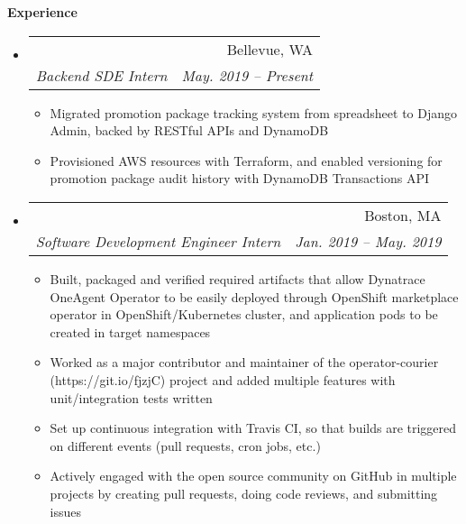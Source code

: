 \documentclass{article}
\makeatletter
\newcommand{\resitem}[1]{
    \item #1
    \vspace{-2pt}
}
\newcommand{\resheading}[1]{{\large \colorbox{mygrey}{\begin{minipage}{\textwidth}{\textbf{#1 \vphantom{p\^{E}}}}\end{minipage}}}}
\newcommand{\ressubheading}[4]{
\begin{tabular*}{6.80in}{l@{\extracolsep{\fill}}r}
    \textbf{#1} & #2 \\
    \textit{#3} & \textit{#4} \\
\end{tabular*}\vspace{-6pt}}
\makeatother
\begin{document}

    \resheading{Experience}

    \begin{itemize}
        \item
        \ressubheading
        {\href
        {https://offerup.com/}
        {OfferUp, Inc - Autos Team}
        }
        {Bellevue, WA}
        {Backend SDE Intern}
        {May. 2019 -- Present}
        {\footnotesize
        \begin{itemize} %
            \resitem
            {Migrated promotion package tracking system from spreadsheet to Django Admin,
            backed by RESTful APIs and DynamoDB}
            \resitem
            {Provisioned AWS resources with Terraform, and enabled versioning for
            promotion package audit history with DynamoDB Transactions API}
        \end{itemize}
        }

        \item
        \ressubheading
        {\href
            {https://operatorhub.io/}
            {Red Hat OpenShift - OperatorHub.io}
        }
        {Boston, MA}
        {Software Development Engineer Intern}
        {Jan. 2019 -- May. 2019}
        {\footnotesize
        \begin{itemize} %
            \resitem
            {Built, packaged and verified required artifacts that allow Dynatrace OneAgent Operator
            to be easily deployed through OpenShift marketplace operator in OpenShift/Kubernetes cluster,
            and application pods to be created in target namespaces}
            \resitem
            {Worked as a major contributor and maintainer of the
                operator-courier (https://git.io/fjzjC)
            project and added multiple features with unit/integration tests written}
            \resitem
            {Set up continuous integration with Travis CI, so that builds are triggered
            on different events (pull requests, cron jobs, etc.)}
            \resitem
            {Actively engaged with the open source community on GitHub in multiple projects
            by creating pull requests, doing code reviews, and submitting issues}
        \end{itemize}
        }


\end{itemize}
\end{document}
